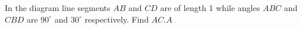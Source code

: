 In the diagram line segments $AB$ and $CD$ are of length 1 while angles $ABC$ and $CBD$ are $90^\circ$ and $30^\circ$ respectively.  Find $AC$.$A$